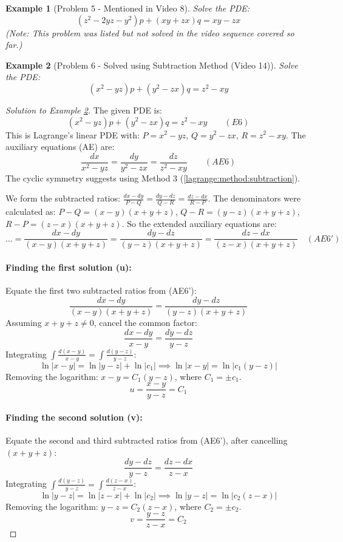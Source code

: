 \documentclass{article}
\newtheorem{example}{Example}[section]    %
\theoremstyle{remark}
\begin{document}
	\begin{example}[Problem 5 - Mentioned in Video 8]
		\label{ex:lagrange5}
		Solve the PDE:
		\[ (z^2-2yz-y^2)p + (xy+zx)q = xy-zx \]
		\textit{(Note: This problem was listed but not solved in the video sequence covered so far.)}
	\end{example}
	
	\begin{example}[Problem 6 - Solved using Subtraction Method (Video 14)]
		\label{ex:lagrange6}
		Solve the PDE:
		\[ (x^2-yz)p + (y^2-zx)q = z^2-xy \]
	\end{example}
	
	\begin{proof}[Solution to Example \ref{ex:lagrange6}]
		The given PDE is:
		\[ (x^2-yz)p + (y^2-zx)q = z^2-xy \quad \quad (E6) \]
		This is Lagrange's linear PDE with: $P = x^2-yz$, $Q = y^2-zx$, $R = z^2-xy$.
		The auxiliary equations (AE) are:
		\[ \frac{dx}{x^2-yz} = \frac{dy}{y^2-zx} = \frac{dz}{z^2-xy} \quad \quad (AE6) \]
		The cyclic symmetry suggests using Method 3 (\ref{lagrange:method:subtraction}).
		
		We form the subtracted ratios: $\frac{dx-dy}{P-Q} = \frac{dy-dz}{Q-R} = \frac{dz-dx}{R-P}$.
		The denominators were calculated as:
		$P-Q = (x-y)(x+y+z)$, $Q-R = (y-z)(x+y+z)$, $R-P = (z-x)(x+y+z)$.
		So the extended auxiliary equations are:
		\[ \dots = \frac{dx-dy}{(x-y)(x+y+z)} = \frac{dy-dz}{(y-z)(x+y+z)} = \frac{dz-dx}{(z-x)(x+y+z)} \quad (AE6') \]
		
		\paragraph{Finding the first solution (u):}
		Equate the first two subtracted ratios from (AE6'):
		\[ \frac{dx-dy}{(x-y)(x+y+z)} = \frac{dy-dz}{(y-z)(x+y+z)} \]
		Assuming $x+y+z \neq 0$, cancel the common factor:
		\[ \frac{dx-dy}{x-y} = \frac{dy-dz}{y-z} \]
		Integrating $\int \frac{d(x-y)}{x-y} = \int \frac{d(y-z)}{y-z}$:
		\[ \ln|x-y| = \ln|y-z| + \ln |c_1| \implies \ln|x-y| = \ln|c_1 (y-z)| \]
		Removing the logarithm: $x-y = C_1 (y-z)$, where $C_1 = \pm c_1$.
		\[ u = \frac{x-y}{y-z} = C_1 \]
		
		\paragraph{Finding the second solution (v):}
		Equate the second and third subtracted ratios from (AE6'), after cancelling $(x+y+z)$:
		\[ \frac{dy-dz}{y-z} = \frac{dz-dx}{z-x} \]
		Integrating $\int \frac{d(y-z)}{y-z} = \int \frac{d(z-x)}{z-x}$:
		\[ \ln|y-z| = \ln|z-x| + \ln |c_2| \implies \ln|y-z| = \ln|c_2 (z-x)| \]
		Removing the logarithm: $y-z = C_2 (z-x)$, where $C_2 = \pm c_2$.
		\[ v = \frac{y-z}{z-x} = C_2 \]
		

\end{proof}
\end{document}
